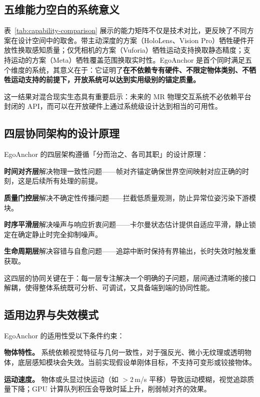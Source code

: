 \documentclass[review]{vgtc}
\begin{document}
\subsection{五维能力空白的系统意义}

表~\ref{tab:capability-comparison} 展示的能力矩阵不仅是技术对比，更反映了不同方案在设计空间中的取舍。带主动深度的方案（HoloLens、Vision Pro）牺牲硬件开放性换取感知质量；仅凭相机的方案（Vuforia）牺牲运动支持换取静态精度；支持运动的方案（Meta）牺牲覆盖范围换取实时性。EgoAnchor 是首个同时满足五个维度的系统，其意义在于：它证明了\textbf{在不依赖专有硬件、不限定物体类别、不牺牲运动支持的前提下，开放系统可以达到实用级别的锚定质量。}

这一结果对混合现实生态具有重要启示：未来的 MR 物理交互系统不必依赖平台封闭的 API，而可以在开放硬件上通过系统级设计达到相当的可用性。

\subsection{四层协同架构的设计原理}

EgoAnchor 的四层架构遵循「分而治之、各司其职」的设计原理：

\noindent\textbf{时间对齐层}解决物理一致性问题——帧对齐锚定确保世界空间映射对应正确的时刻，这是后续所有处理的前提。

\noindent\textbf{质量门控层}解决不确定性传播问题——拦截低质量观测，防止异常位姿污染下游模块。

\noindent\textbf{时序平滑层}解决噪声与响应折衷问题——卡尔曼状态估计提供自适应平滑，静止锁定在确定静止时完全抑制噪声。

\noindent\textbf{生命周期层}解决容错与自愈问题——追踪中断时保持有界输出，长时失效时触发重获取。

这四层的协同关键在于：每一层专注解决一个明确的子问题，层间通过清晰的接口解耦，使得整体系统既可分析、可调试，又具备端到端的协同性能。

\subsection{适用边界与失效模式}

EgoAnchor 的适用性受以下条件约束：

\noindent\textbf{物体特性。} 系统依赖视觉特征与几何一致性，对于强反光、微小无纹理或透明物体，底层感知模块会失效。当前实现假设单刚体目标，不支持可变形或铰接物体。

\noindent\textbf{运动速度。} 物体或头显过快运动（如 $>2$\,m/s 平移）导致运动模糊，视觉追踪质量下降；GPU 计算队列积压会导致时延上升，削弱帧对齐的效果。
\end{document}

